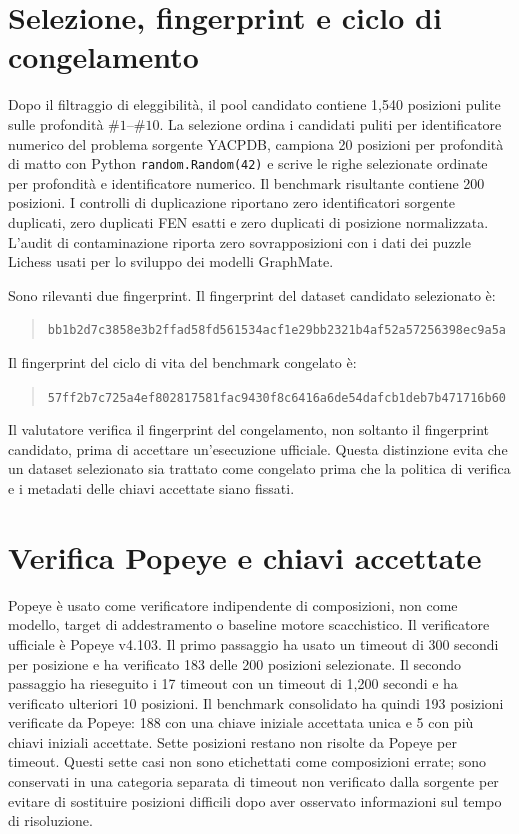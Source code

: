 

\section{Selezione, fingerprint e ciclo di congelamento}
\label{app:classic-benchmark:selection}

Dopo il filtraggio di eleggibilità, il pool candidato contiene 1,540 posizioni pulite sulle profondità \(\#1\)--\(\#10\).  La selezione ordina i candidati puliti per identificatore numerico del problema sorgente YACPDB, campiona 20 posizioni per profondità di matto con Python \texttt{random.Random(42)} e scrive le righe selezionate ordinate per profondità e identificatore numerico.  Il benchmark risultante contiene 200 posizioni.  I controlli di duplicazione riportano zero identificatori sorgente duplicati, zero duplicati FEN esatti e zero duplicati di posizione normalizzata.  L'audit di contaminazione riporta zero sovrapposizioni con i dati dei puzzle Lichess usati per lo sviluppo dei modelli GraphMate.

Sono rilevanti due fingerprint.  Il fingerprint del dataset candidato selezionato è:
\begin{quote}
\small\nolinkurl{bb1b2d7c3858e3b2ffad58fd561534acf1e29bb2321b4af52a57256398ec9a5a}
\end{quote}
Il fingerprint del ciclo di vita del benchmark congelato è:
\begin{quote}
\small\nolinkurl{57ff2b7c725a4ef802817581fac9430f8c6416a6de54dafcb1deb7b471716b60}
\end{quote}
Il valutatore verifica il fingerprint del congelamento, non soltanto il fingerprint candidato, prima di accettare un'esecuzione ufficiale.  Questa distinzione evita che un dataset selezionato sia trattato come congelato prima che la politica di verifica e i metadati delle chiavi accettate siano fissati.

\section{Verifica Popeye e chiavi accettate}
\label{app:classic-benchmark:popeye}

Popeye è usato come verificatore indipendente di composizioni, non come modello, target di addestramento o baseline motore scacchistico.  Il verificatore ufficiale è Popeye v4.103.  Il primo passaggio ha usato un timeout di 300 secondi per posizione e ha verificato 183 delle 200 posizioni selezionate.  Il secondo passaggio ha rieseguito i 17 timeout con un timeout di 1,200 secondi e ha verificato ulteriori 10 posizioni.  Il benchmark consolidato ha quindi 193 posizioni verificate da Popeye: 188 con una chiave iniziale accettata unica e 5 con più chiavi iniziali accettate.  Sette posizioni restano non risolte da Popeye per timeout.  Questi sette casi non sono etichettati come composizioni errate; sono conservati in una categoria separata di timeout non verificato dalla sorgente per evitare di sostituire posizioni difficili dopo aver osservato informazioni sul tempo di risoluzione.

